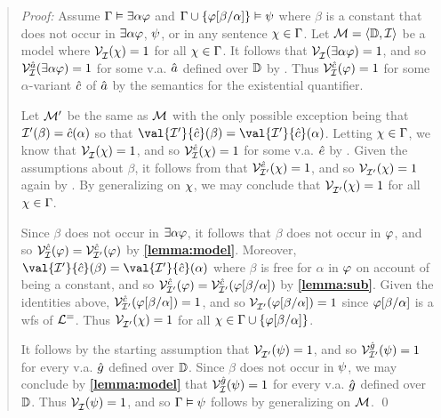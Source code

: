 \begin{quote} 
  \textit{Proof:} Assume $\Gamma \vDash \exists\alpha\varphi$ and $\Gamma \cup \lbrace\varphi[\beta/\alpha]\rbrace \vDash \psi$ where $\beta$ is a constant that does not occur in $\exists\alpha\varphi$, $\psi$, or in any sentence $\chi\in\Gamma$. 
  Let $\mathcal{M}=\langle\mathbb{D},\mathcal{I}\rangle$ be a model where $\mathcal{V}_{\mathcal{I}}^{}(\chi) = 1$ for all $\chi \in \Gamma$.
  It follows that $\mathcal{V}_{\mathcal{I}}^{}(\exists \alpha\varphi) = 1$, and so $\mathcal{V}_{\mathcal{I}}^{\hat{a}}(\exists \alpha\varphi)=1$ for some v.a. $\hat{a}$ defined over $\mathbb{D}$ by .
  Thus $\mathcal{V}_{\mathcal{I}}^{\hat{c}}(\varphi)=1$ for some $\alpha$-variant $\hat{c}$ of $\hat{a}$ by the semantics for the existential quantifier.

  Let $\mathcal{M}'$ be the same as $\mathcal{M}$ with the only possible exception being that $\mathcal{I}'(\beta)=\hat{c}(\alpha)$ so that $\val{\I'}{\va{c}}(\beta)=\val{\I'}{\va{c}}(\alpha)$.
  Letting $\chi \in \Gamma$, we know that $\mathcal{V}_{\mathcal{I}}^{}(\chi) = 1$, and so $\mathcal{V}_{\mathcal{I}}^{\hat{e}}(\chi) = 1$ for some v.a. $\hat{e}$ by .
  Given the assumptions about $\beta$, it follows from  that $\mathcal{V}_{\mathcal{I}'}^{\hat{e}}(\chi) = 1$, and so $\mathcal{V}_{\mathcal{I}'}^{}(\chi) = 1$ again by .
  By generalizing on $\chi$, we may conclude that $\mathcal{V}_{\mathcal{I}'}^{}(\chi) = 1$ for all $\chi \in \Gamma$.

  Since $\beta$ does not occur in $\exists \alpha\varphi$, it follows that $\beta$ does not occur in $\varphi$, and so $\mathcal{V}_{\mathcal{I}}^{\hat{c}}(\varphi)=\mathcal{V}_{\mathcal{I}'}^{\hat{c}}(\varphi)$ by \textbf{\ref{lemma:model}}.
  Moreover, $\val{\I'}{\va{c}}(\beta)=\val{\I'}{\va{c}}(\alpha)$ where $\beta$ is free for $\alpha$ in $\varphi$ on account of being a constant, and so $\mathcal{V}_{\mathcal{I}'}^{\hat{c}}(\varphi)=\mathcal{V}_{\mathcal{I}'}^{\hat{c}}(\varphi[\beta/\alpha])$ by \textbf{\ref{lemma:sub}}. 
  Given the identities above, $\mathcal{V}_{\mathcal{I}'}^{\hat{c}}(\varphi[\beta/\alpha])=1$, and so $\mathcal{V}_{\mathcal{I}'}^{}(\varphi[\beta/\alpha])=1$ since $\varphi[\beta/\alpha]$ is a wfs of $\mathcal{L}^{=}$.
  Thus $\mathcal{V}_{\mathcal{I}'}^{}(\chi) = 1$ for all $\chi \in \Gamma \cup \lbrace\varphi[\beta/\alpha]\rbrace$.

  It follows by the starting assumption that $\mathcal{V}_{\mathcal{I}'}^{}(\psi) = 1$, and so $\mathcal{V}_{\mathcal{I}'}^{\hat{g}}(\psi)=1$ for every v.a. $\hat{g}$ defined over $\mathbb{D}$.
  Since $\beta$ does not occur in $\psi$, we may conclude by \textbf{\ref{lemma:model}} that $\mathcal{V}_{\mathcal{I}}^{\hat{g}}(\psi)=1$ for every v.a. $\hat{g}$ defined over $\mathbb{D}$.
  Thus $\mathcal{V}_{\mathcal{I}}^{}(\psi)=1$, and so $\Gamma \vDash \psi$ follows by generalizing on $\mathcal{M}$.
  \qed
\end{quote}

